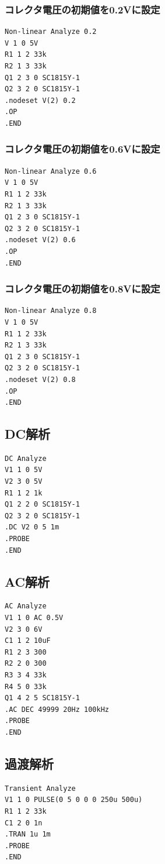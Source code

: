 \documentclass{jlreq}
\numberwithin{equation}{section}
\begin{document}
\subsubsection{コレクタ電圧の初期値を0.2Vに設定}
\begin{verbatim}
Non-linear Analyze 0.2
V 1 0 5V
R1 1 2 33k
R2 1 3 33k
Q1 2 3 0 SC1815Y-1
Q2 3 2 0 SC1815Y-1
.nodeset V(2) 0.2
.OP
.END
\end{verbatim}

\subsubsection{コレクタ電圧の初期値を0.6Vに設定}
\begin{verbatim}
Non-linear Analyze 0.6
V 1 0 5V
R1 1 2 33k
R2 1 3 33k
Q1 2 3 0 SC1815Y-1
Q2 3 2 0 SC1815Y-1
.nodeset V(2) 0.6
.OP
.END
\end{verbatim}

\subsubsection{コレクタ電圧の初期値を0.8Vに設定}
\begin{verbatim}
Non-linear Analyze 0.8
V 1 0 5V
R1 1 2 33k
R2 1 3 33k
Q1 2 3 0 SC1815Y-1
Q2 3 2 0 SC1815Y-1
.nodeset V(2) 0.8
.OP
.END
\end{verbatim}

\subsection{DC解析}
\begin{verbatim}
DC Analyze
V1 1 0 5V
V2 3 0 5V
R1 1 2 1k
Q1 2 2 0 SC1815Y-1
Q2 3 2 0 SC1815Y-1
.DC V2 0 5 1m
.PROBE
.END
\end{verbatim}

\subsection{AC解析}
\begin{verbatim}
AC Analyze
V1 1 0 AC 0.5V
V2 3 0 6V
C1 1 2 10uF
R1 2 3 300
R2 2 0 300
R3 3 4 33k
R4 5 0 33k
Q1 4 2 5 SC1815Y-1
.AC DEC 49999 20Hz 100kHz
.PROBE
.END
\end{verbatim}

\subsection{過渡解析}
\begin{verbatim}
Transient Analyze
V1 1 0 PULSE(0 5 0 0 0 250u 500u)
R1 1 2 33k
C1 2 0 1n
.TRAN 1u 1m
.PROBE
.END
\end{verbatim}
\end{document}
